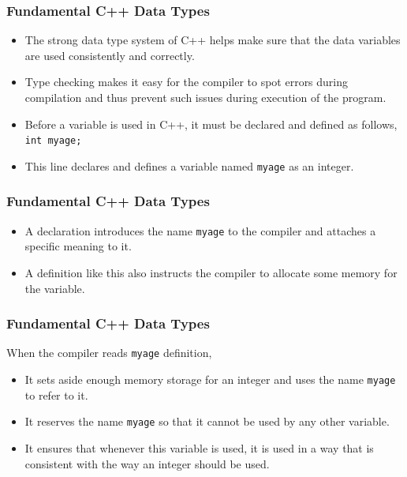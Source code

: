 \documentclass{beamer}
\begin{document}
\begin{frame}
    \frametitle{Fundamental C++ Data Types}
    \begin{itemize}
        \item The strong data type system of C++ helps make sure that the data variables are used consistently and correctly.
        \item Type checking makes it easy for the compiler to spot errors during compilation and thus prevent such issues during execution of the program.
        \item Before a variable is used in C++, it must be declared and defined as follows, \\
        \texttt{int myage;}
        \item This line declares and defines a variable named \texttt{myage} as an integer.
    \end{itemize}
\end{frame}

\begin{frame}
    \frametitle{Fundamental C++ Data Types}
    \begin{itemize}
        \item A declaration introduces the name \texttt{myage} to the compiler and attaches a specific meaning to it.
        \item A definition like this also instructs the compiler to allocate some memory for the variable.
    \end{itemize}
\end{frame}

\begin{frame}
    \frametitle{Fundamental C++ Data Types}
    When the compiler reads \texttt{myage} definition,
    \begin{itemize}
        \item It sets aside enough memory storage for an integer and uses the name \texttt{myage} to refer to it.
        \item It reserves the name \texttt{myage} so that it cannot be used by any other variable.
        \item It ensures that whenever this variable is used, it is used in a way that is consistent with the way an integer should be used.
    \end{itemize}
\end{frame}
\end{document}
